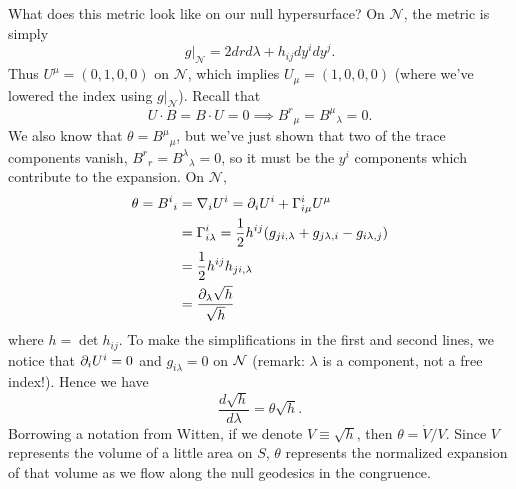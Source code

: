What does this metric look like on our null hypersurface? On $\mathcal{N}$, the metric is simply
\begin{equation}\label{nullhsurfacemetric}
    g|_{\mathcal{N}}= 2drd\lambda +h_{ij} dy^i dy^j.
\end{equation}
Thus $U^\mu=(0,1,0,0)$ on $\mathcal{N}$, which implies $U_\mu=(1,0,0,0)$ (where we've lowered the index using $g|_{\mathcal{N}}$). Recall that 
\begin{equation}
    U\cdot B = B\cdot U=0 \implies B^r{}_\mu = B^\mu{}_\lambda = 0.
\end{equation}
We also know that $\theta=B^\mu{}_\mu$, but we've just shown that two of the trace components vanish, $B^r{}_r=B^\lambda{}_\lambda=0$, so it must be the $y^i$ components which contribute to the expansion. On $\mathcal{N},$
\begin{align}
    \theta = B^i{}_i &=\nabla_i U^i = \partial_i U^i +\Gamma^i_{i\mu} U^\mu\\
    &= \Gamma^i_{i \lambda} =\frac{1}{2} h^{ij}(g_{ji,\lambda} + g_{j\lambda,i}-g_{i\lambda,j})\\
    &=\frac{1}{2} h^{ij}h_{ji,\lambda}\\
    &= \frac{\partial_\lambda\sqrt{h}}{\sqrt{h}}
\end{align}
where $h=\det h_{ij}$. To make the simplifications in the first and second lines, we notice that $\partial_i U^i=0$ and $g_{i\lambda}=0$ on $\mathcal N$ (remark: $\lambda$ is a component, not a free index!). Hence we have
\begin{equation}
    \frac{d\sqrt{h}}{d\lambda} = \theta \sqrt{h}.
\end{equation}
Borrowing a notation from Witten, if we denote $V\equiv \sqrt{h}$, then $\theta = \dot V/V$. Since $V$ represents the volume of a little area on $S$, $\theta$ represents the normalized expansion of that volume as we flow along the null geodesics in the congruence.

